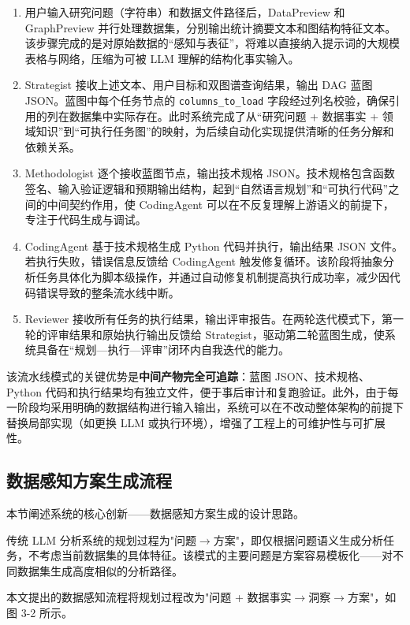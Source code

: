 \begin{enumerate}[(1)]
\item 用户输入研究问题（字符串）和数据文件路径后，DataPreview 和 GraphPreview 并行处理数据集，分别输出统计摘要文本和图结构特征文本。该步骤完成的是对原始数据的“感知与表征”，将难以直接纳入提示词的大规模表格与网络，压缩为可被 LLM 理解的结构化事实输入。
\item Strategist 接收上述文本、用户目标和双图谱查询结果，输出 DAG 蓝图 JSON。蓝图中每个任务节点的 \texttt{columns\_to\_load} 字段经过列名校验，确保引用的列在数据集中实际存在。此时系统完成了从“研究问题 + 数据事实 + 领域知识”到“可执行任务图”的映射，为后续自动化实现提供清晰的任务分解和依赖关系。
\item Methodologist 逐个接收蓝图节点，输出技术规格 JSON。技术规格包含函数签名、输入验证逻辑和预期输出结构，起到“自然语言规划”和“可执行代码”之间的中间契约作用，使 CodingAgent 可以在不反复理解上游语义的前提下，专注于代码生成与调试。
\item CodingAgent 基于技术规格生成 Python 代码并执行，输出结果 JSON 文件。若执行失败，错误信息反馈给 CodingAgent 触发修复循环。该阶段将抽象分析任务具体化为脚本级操作，并通过自动修复机制提高执行成功率，减少因代码错误导致的整条流水线中断。
\item Reviewer 接收所有任务的执行结果，输出评审报告。在两轮迭代模式下，第一轮的评审结果和原始执行输出反馈给 Strategist，驱动第二轮蓝图生成，使系统具备在“规划—执行—评审”闭环内自我迭代的能力。
\end{enumerate}

该流水线模式的关键优势是\textbf{中间产物完全可追踪}：蓝图 JSON、技术规格、Python 代码和执行结果均有独立文件，便于事后审计和复跑验证\cite{hong2024metagpt}。此外，由于每一阶段均采用明确的数据结构进行输入输出，系统可以在不改动整体架构的前提下替换局部实现（如更换 LLM 或执行环境），增强了工程上的可维护性与可扩展性。

\subsection{数据感知方案生成流程}

本节阐述系统的核心创新——数据感知方案生成的设计思路。

传统 LLM 分析系统的规划过程为"问题$\rightarrow$方案"，即仅根据问题语义生成分析任务，不考虑当前数据集的具体特征。该模式的主要问题是方案容易模板化——对不同数据集生成高度相似的分析路径\cite{guo2024dsagent,hong2025data}。

本文提出的数据感知流程将规划过程改为"问题 + 数据事实$\rightarrow$洞察$\rightarrow$方案"，如图 3-2 所示。


